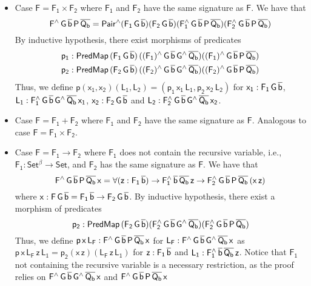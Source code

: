 \documentclass[acmsmall,screen,review,anonymous]{acmart}
\theoremstyle{definition}
\begin{document}
\begin{itemize}
\item Case $\mathsf{F = F_1 \times F_2}$ where $\mathsf{F_1}$ and $\mathsf{F_2}$ have the same signature as $\mathsf{F}$.
We have that
\[
\mathsf{F^{\wedge}\,G\,\overline{b}\,P\,\overline{Q_b}
= Pair^{\wedge}(F_1\,G\,\overline{b})(F_2\,G\,\overline{b})(F_1^{\wedge}\,G\,\overline{b}\,P\,\overline{Q_b}) (F_2^{\wedge}\,G\,\overline{b}\,P\,\overline{Q_b})}
\]
By inductive hypothesis, there exist morphisms of predicates
\begin{gather*}
\mathsf{p_1 : PredMap\,(F_1\,G\,\overline{b})\,((F_1)^{\wedge}\,G\,\overline{b}\,G^{\wedge}\,\overline{Q_b}) ((F_1)^{\wedge}\,G\,\overline{b}\,P\,\overline{Q_b})} \\
\mathsf{p_2 : PredMap\,(F_2\,G\,\overline{b})\,((F_2)^{\wedge}\,G\,\overline{b}\,G^{\wedge}\,\overline{Q_b}) ((F_2)^{\wedge}\,G\,\overline{b}\,P\,\overline{Q_b})}
\end{gather*}
Thus, we define $\mathsf{p (x_1, x_2) (L_1, L_2) = (p_1\,x_1\,L_1, p_2\,x_2\,L_2)}$ 
for 
$\mathsf{x_1 : F_1\,G\,\overline{b}}$,
$\mathsf{L_1 : F_1^{\wedge}\,G\,\overline{b}\,G^{\wedge}\,\overline{Q_b}\,x_1}$,
$\mathsf{x_2 : F_2\,G\,\overline{b}}$
and $\mathsf{L_2 : F_2^{\wedge}\,G\,\overline{b}\,G^{\wedge}\,\overline{Q_b}\,x_2}$.
\item Case $\mathsf{F = F_1 + F_2}$ where $\mathsf{F_1}$ and $\mathsf{F_2}$ have the same signature as $\mathsf{F}$.
Analogous to case $\mathsf{F = F_1 \times F_2}$.
\item Case $\mathsf{F = F_1 \to F_2}$
where $\mathsf{F_1}$ does not contain the recursive variable,
i.e., $\mathsf{F_1 : Set^\beta \to Set}$,
and $\mathsf{F_2}$ has the same signature as $\mathsf{F}$.
We have that
\[
\mathsf{F^{\wedge}\,G\,\overline{b}\,P\,\overline{Q_b}\,x = \forall (z : F_1\,\overline{b}) \to F_1^{\wedge}\,\overline{b}\,\overline{Q_b}\,z \to F_2^{\wedge}\,G\,\overline{b}\,P\,\overline{Q_b}\,(x\,z)}
\]
where $\mathsf{x : F\,G\,\overline{b} = F_1\,\overline{b} \to F_2\,G\,\overline{b}}$.
By inductive hypothesis, there exist a morphism of predicates
\[
\mathsf{p_2 : PredMap\,(F_2\,G\,\overline{b}) (F_2^{\wedge}\,G\,\overline{b}\,G^{\wedge}\,\overline{Q_b}) (F_2^{\wedge}\,G\,\overline{b}\,P\,\overline{Q_b})}
\]
Thus, we define $\mathsf{p\,x\,L_F : F^{\wedge}\,G\,\overline{b}\,P\,\overline{Q_b}\,x}$
for $\mathsf{L_F : F^{\wedge}\,G\,\overline{b}\,G^{\wedge}\,\overline{Q_b}\,x}$
as $\mathsf{p\,x\,L_F\,z\,L_1 = p_2 (x\,z) (L_F\,z\,L_1)}$
for $\mathsf{z : F_1\,\overline{b}}$
and $\mathsf{L_1 : F_1^{\wedge}\,\overline{b}\,\overline{Q_b}\,z}$.
Notice that $\mathsf{F_1}$ not containing the recursive variable
is a necessary restriction, as the proof relies on
$\mathsf{F^{\wedge}\,G\,\overline{b}\,G^{\wedge}\,\overline{Q_b}\,x}$
and $\mathsf{F^{\wedge}\,G\,\overline{b}\,P\,\overline{Q_b}\,x}$

\end{itemize}
\end{document}
